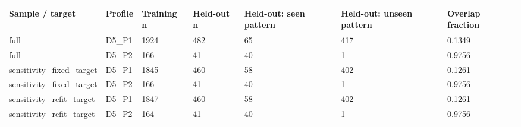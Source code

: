 \begin{tabular}{lllllll}
\toprule
Sample / target & Profile & Training n & Held-out n & Held-out: seen pattern & Held-out: unseen pattern & Overlap fraction \\
\midrule
full & D5\_P1 & 1924 & 482 & 65 & 417 & 0.1349 \\
full & D5\_P2 & 166 & 41 & 40 & 1 & 0.9756 \\
sensitivity\_fixed\_target & D5\_P1 & 1845 & 460 & 58 & 402 & 0.1261 \\
sensitivity\_fixed\_target & D5\_P2 & 166 & 41 & 40 & 1 & 0.9756 \\
sensitivity\_refit\_target & D5\_P1 & 1847 & 460 & 58 & 402 & 0.1261 \\
sensitivity\_refit\_target & D5\_P2 & 164 & 41 & 40 & 1 & 0.9756 \\
\bottomrule
\end{tabular}
